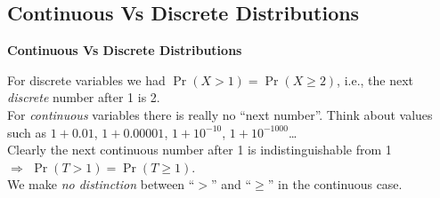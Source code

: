 \documentclass[compress]{beamer}        %
\makeatletter
\newcommand{\tcb}{\textcolor{beamer@blendedblue}}
\makeatother
\begin{document}
\subsection{Continuous Vs Discrete Distributions}
\begin{frame}{\bf \tcb{Continuous  Vs Discrete Distributions}}

For discrete variables we had $\Pr(X > 1) = \Pr(X \ge 2)$, i.e., the next \emph{discrete} number after 1 is 2.\\[0.8cm]

For \emph{continuous} variables there is really no ``next number''. Think about values such as $1 + 0.01$, $1 + 0.00001$, $1 + 10^{-10}$, $1 + 10^{-1000}$\ldots\\[0.2cm]

Clearly the next continuous number after 1 is indistinguishable from 1\\[0.2cm]
$\Rightarrow$ $\Pr(T > 1) = \Pr(T \ge 1)$.\\[0.9cm]

We make \emph{no distinction} between ``$>$'' and ``$\ge$'' in the continuous case.%

\end{frame}
\end{document}
